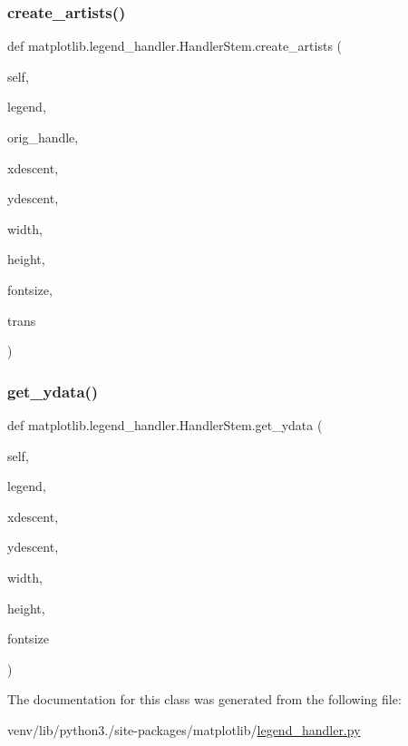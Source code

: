 \subsubsection{\texorpdfstring{create\+\_\+artists()}{create\_artists()}}
{\footnotesize\ttfamily def matplotlib.\+legend\+\_\+handler.\+Handler\+Stem.\+create\+\_\+artists (\begin{DoxyParamCaption}\item[{}]{self,  }\item[{}]{legend,  }\item[{}]{orig\+\_\+handle,  }\item[{}]{xdescent,  }\item[{}]{ydescent,  }\item[{}]{width,  }\item[{}]{height,  }\item[{}]{fontsize,  }\item[{}]{trans }\end{DoxyParamCaption})}

\mbox{\label{classmatplotlib_1_1legend__handler_1_1HandlerStem_a2f87fa4ab11eba1bea81f4f3fb663aae}} 
\subsubsection{\texorpdfstring{get\+\_\+ydata()}{get\_ydata()}}
{\footnotesize\ttfamily def matplotlib.\+legend\+\_\+handler.\+Handler\+Stem.\+get\+\_\+ydata (\begin{DoxyParamCaption}\item[{}]{self,  }\item[{}]{legend,  }\item[{}]{xdescent,  }\item[{}]{ydescent,  }\item[{}]{width,  }\item[{}]{height,  }\item[{}]{fontsize }\end{DoxyParamCaption})}



The documentation for this class was generated from the following file\+:\begin{DoxyCompactItemize}
\item 
venv/lib/python3./site-\/packages/matplotlib/\hyperlink{legend__handler_8py}{legend\+\_\+handler.\+py}\end{DoxyCompactItemize}

